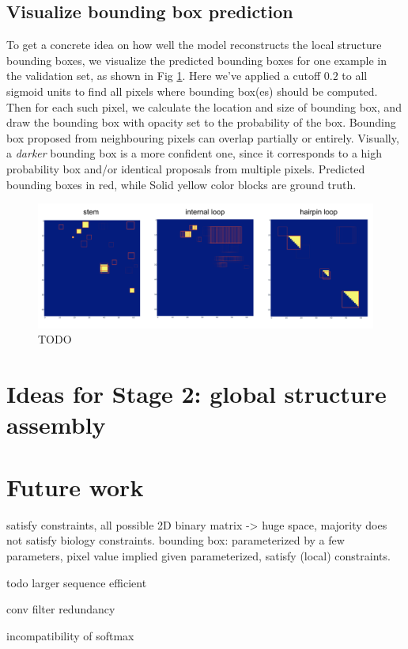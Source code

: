 \documentclass[12pt]{article}
\begin{document}
\subsection{Visualize bounding box prediction}

To get a concrete idea on how well the model reconstructs the local structure bounding boxes,
we visualize the predicted bounding boxes for one example in the validation set, as shown in Fig \ref{fig:visualize_bb_prediction}.
Here we've applied a cutoff $0.2$ to all sigmoid units to find all pixels where bounding box(es) should be computed.
Then for each such pixel, we calculate the location and size of bounding box,
and draw the bounding box with opacity set to the probability of the box.
Bounding box proposed from neighbouring pixels can overlap partially or entirely.
Visually, a \textit{darker} bounding box is a more confident one,
since it corresponds to a high probability box and/or identical proposals from multiple pixels.
Predicted bounding boxes in red, while Solid yellow color blocks are ground truth.

\begin{figure}[h]
    \centering
    \includegraphics[width=\textwidth]{plot/visualize_bb_prediction.png}
    \caption{TODO}
    \label{fig:visualize_bb_prediction}
    \centering
\end{figure}



\section{Ideas for Stage 2: global structure assembly}


\section{Future work}

satisfy constraints,
all possible 2D binary matrix -> huge space, majority does not satisfy biology constraints.
bounding box: parameterized by a few parameters,
pixel value implied given parameterized, satisfy (local) constraints.



todo larger sequence efficient

conv filter redundancy

incompatibility of softmax

%
%
\end{document}
